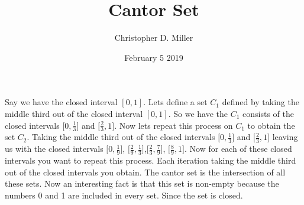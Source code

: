 \documentclass[12pt]{article}
\title{Cantor Set}
\author{Christopher D. Miller}
\date{February 5 2019}
\theoremstyle{plain}
\begin{document}
\maketitle

Say we have the closed interval $[0,1].$ Lets define a set $C_1$ defined by taking the middle third out of the closed interval $[0,1]$. So we have the $C_1$ consists of the closed intervals $\big[0,\frac{1}{3}\big]$ and $\big[\frac{2}{3},1\big]$. Now lets repeat this process on $C_1$ to obtain the set $C_2$. Taking the middle third out of the closed intervals $\big[0,\frac{1}{3}\big]$ and $\big[\frac{2}{3},1\big]$ leaving us with the closed intervals $\big[0,\frac{1}{9}\big]$, $\big[\frac{2}{9},\frac{1}{3}\big]$,$\big[\frac{2}{3},\frac{7}{9}\big]$, $\big[\frac{8}{9},1\big]$. Now for each of these closed intervals you want to repeat this process. Each iteration taking the middle third out of the closed intervals you obtain. The cantor set is the intersection of all these sets. Now an interesting fact is that this set is non-empty because the numbers 0 and 1 are included in every set. Since the set is closed.
\end{document}
